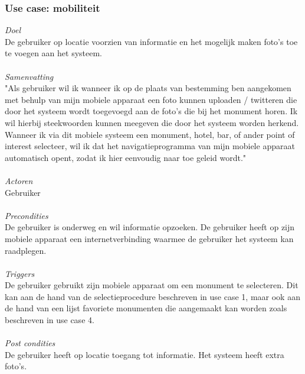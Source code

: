 \documentclass[a4paper,10pt]{article}
\begin{document}
			\subsubsection{Use case: mobiliteit}
			\textit{Doel}\\
			De gebruiker op locatie voorzien van informatie en het mogelijk maken foto's toe te voegen aan het systeem.\\ \\
			\textit{Samenvatting}\\
			"Als gebruiker wil ik wanneer ik op de plaats van bestemming ben aangekomen met behulp van mijn mobiele apparaat een foto kunnen uploaden / twitteren die door het systeem wordt toegevoegd aan de foto's die bij het monument horen. Ik wil hierbij steekwoorden kunnen meegeven die door het systeem worden herkend. Wanneer ik via dit mobiele systeem een monument, hotel, bar, of ander point of interest selecteer, wil ik dat het navigatieprogramma van mijn mobiele apparaat automatisch opent, zodat ik hier eenvoudig naar toe geleid wordt."\\ \\
			\textit{Actoren}\\
			Gebruiker\\ \\
			\textit{Precondities}\\
			De gebruiker is onderweg en wil informatie opzoeken. De gebruiker heeft op zijn mobiele apparaat een internetverbinding waarmee de gebruiker het systeem kan raadplegen.\\ \\
			\textit{Triggers}\\
			De gebruiker gebruikt zijn mobiele apparaat om een monument te selecteren. Dit kan aan de hand van de selectieprocedure beschreven in use case 1, maar ook aan de hand van een lijst favoriete monumenten die aangemaakt kan worden zoals beschreven in use case 4.\\ \\
			\textit{Post condities}\\
			De gebruiker heeft op locatie toegang tot informatie. Het systeem heeft extra foto's.	
			
\end{document}
